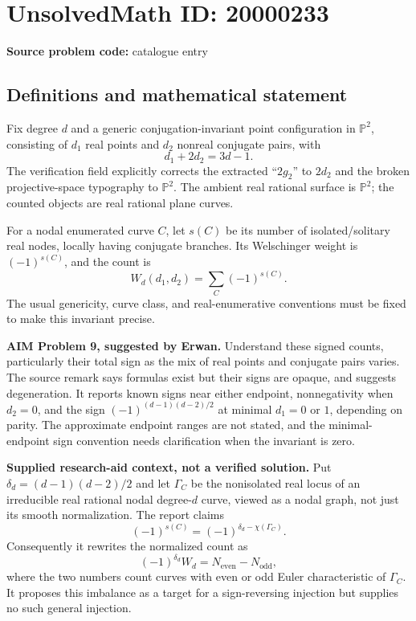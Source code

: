 \documentclass[11pt]{article}
\begin{document}
\section*{UnsolvedMath ID: 20000233}
\textbf{Source problem code:} catalogue entry
\subsection{Definitions and mathematical statement}
Fix degree $d$ and a generic conjugation-invariant point configuration in $\mathbb P^2$, consisting of $d_1$ real points and $d_2$ nonreal conjugate pairs, with
\[
 d_1+2d_2=3d-1.
\]
The verification field explicitly corrects the extracted ``$2g_2$'' to $2d_2$ and the broken projective-space typography to $\mathbb P^2$. The ambient real rational surface is $\mathbb P^2$; the counted objects are real rational plane curves.

For a nodal enumerated curve $C$, let $s(C)$ be its number of isolated/solitary real nodes, locally having conjugate branches. Its Welschinger weight is $(-1)^{s(C)}$, and the count is
\[
 W_d(d_1,d_2)=\sum_C(-1)^{s(C)}.
\]
The usual genericity, curve class, and real-enumerative conventions must be fixed to make this invariant precise.

\textbf{AIM Problem 9, suggested by Erwan.} Understand these signed counts, particularly their total sign as the mix of real points and conjugate pairs varies. The source remark says formulas exist but their signs are opaque, and suggests degeneration. It reports known signs near either endpoint, nonnegativity when $d_2=0$, and the sign $(-1)^{(d-1)(d-2)/2}$ at minimal $d_1=0$ or $1$, depending on parity. The approximate endpoint ranges are not stated, and the minimal-endpoint sign convention needs clarification when the invariant is zero.

\textbf{Supplied research-aid context, not a verified solution.} Put $\delta_d=(d-1)(d-2)/2$ and let $\Gamma_C$ be the nonisolated real locus of an irreducible real rational nodal degree-$d$ curve, viewed as a nodal graph, not just its smooth normalization. The report claims
\[
 (-1)^{s(C)}=(-1)^{\delta_d-\chi(\Gamma_C)}.
\]
Consequently it rewrites the normalized count as
\[
 (-1)^{\delta_d}W_d=N_{\mathrm{even}}-N_{\mathrm{odd}},
\]
where the two numbers count curves with even or odd Euler characteristic of $\Gamma_C$. It proposes this imbalance as a target for a sign-reversing injection but supplies no such general injection.
\end{document}

